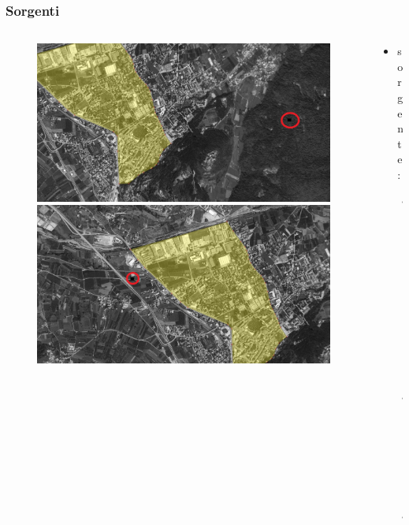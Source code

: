 \documentclass{beamer}
\begin{document}
\begin{frame}
 \frametitle{Sorgenti}
 \begin{columns}
    \begin{column}{.5\textwidth}
     \begin{figure}
      \centering
      \begin{overprint}
       \includegraphics[width=\linewidth]{images/sorgente_01}
       \includegraphics[width=\linewidth]{images/sorgente_02}
      \end{overprint}
     \end{figure}
    \end{column}
%
    \begin{column}{.5\textwidth}
     \begin{itemize}
      \item sorgente:
      \begin{itemize}
       \item nome: \emph{ciomba 4}
       \item quota: $660.97\,m$
       \item portata: $0.6\,l/_s$
      \end{itemize}

\end{itemize}
\end{column}
\end{columns}
\end{frame}
\end{document}
